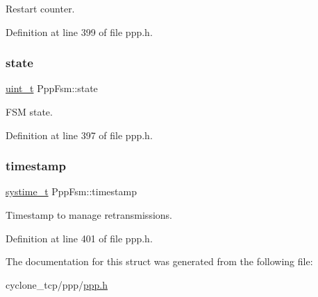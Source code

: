 Restart counter. 



Definition at line 399 of file ppp.\+h.

\mbox{\label{structPppFsm_ac5031e0c5bb00a8604a2cd1f3616c948}} 
\subsubsection{\texorpdfstring{state}{state}}
{\footnotesize\ttfamily \hyperlink{compiler__port_8h_a12a1e9b3ce141648783a82445d02b58d}{uint\+\_\+t} Ppp\+Fsm\+::state}



F\+SM state. 



Definition at line 397 of file ppp.\+h.

\mbox{\label{structPppFsm_a6326e54dca1a758a4d62a92ef9858b19}} 
\subsubsection{\texorpdfstring{timestamp}{timestamp}}
{\footnotesize\ttfamily \hyperlink{compiler__port_8h_ae3e32a98d431a02106616da3071832dd}{systime\+\_\+t} Ppp\+Fsm\+::timestamp}



Timestamp to manage retransmissions. 



Definition at line 401 of file ppp.\+h.



The documentation for this struct was generated from the following file\+:\begin{DoxyCompactItemize}
\item 
cyclone\+\_\+tcp/ppp/\hyperlink{ppp_8h}{ppp.\+h}\end{DoxyCompactItemize}
